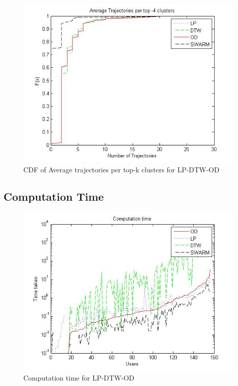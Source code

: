 \begin{figure}[H]
\centering     
\includegraphics[scale=0.3]{figs/avgtop.jpg}
\caption{CDF of Average trajectories per top-k clusters for LP-DTW-OD}
\label{fig:avgtop_cdf}  
\end{figure} 

\subsection{Computation Time}

\begin{figure}[H]
\centering     
\includegraphics[scale=0.3]{figs/time_log.jpg}
\caption{Computation time  for LP-DTW-OD}
\label{fig:time_cdf}  
\end{figure} 

